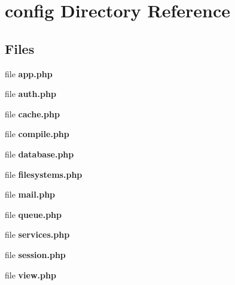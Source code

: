 \section{config Directory Reference}
\label{dir_8d296b8e91e52353c203964dff48fb20}
\subsection*{Files}
\begin{DoxyCompactItemize}
\item 
file {\bf app.\+php}
\item 
file {\bf auth.\+php}
\item 
file {\bf cache.\+php}
\item 
file {\bf compile.\+php}
\item 
file {\bf database.\+php}
\item 
file {\bf filesystems.\+php}
\item 
file {\bf mail.\+php}
\item 
file {\bf queue.\+php}
\item 
file {\bf services.\+php}
\item 
file {\bf session.\+php}
\item 
file {\bf view.\+php}
\end{DoxyCompactItemize}
